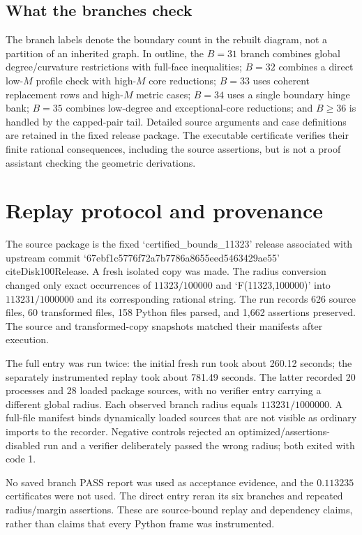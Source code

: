 \documentclass[11pt]{article}
\begin{document}
\subsection{What the branches check}
The branch labels denote the boundary count in the rebuilt diagram, not a partition of an inherited graph. In outline, the $B=31$ branch combines global degree/curvature restrictions with full-face inequalities; $B=32$ combines a direct low-$M$ profile check with high-$M$ core reductions; $B=33$ uses coherent replacement rows and high-$M$ metric cases; $B=34$ uses a single boundary hinge bank; $B=35$ combines low-degree and exceptional-core reductions; and $B\geq36$ is handled by the capped-pair tail. Detailed source arguments and case definitions are retained in the fixed release package. The executable certificate verifies their finite rational consequences, including the source assertions, but is not a proof assistant checking the geometric derivations.

\section{Replay protocol and provenance}
\label{sec:replay}
The source package is the fixed `certified\_bounds\_11323' release associated with upstream commit `67ebf1c5776f72a7b7786a8655eed5463429ae55'~\\cite{Disk100Release}. A fresh isolated copy was made. The radius conversion changed only exact occurrences of $11323/100000$ and `F(11323,100000)' into $113231/1000000$ and its corresponding rational string. The run records 626 source files, 60 transformed files, 158 Python files parsed, and 1,662 assertions preserved. The source and transformed-copy snapshots matched their manifests after execution.

The full entry was run twice: the initial fresh run took about 260.12 seconds; the separately instrumented replay took about 781.49 seconds. The latter recorded 20 processes and 28 loaded package sources, with no verifier entry carrying a different global radius. Each observed branch radius equals $113231/1000000$. A full-file manifest binds dynamically loaded sources that are not visible as ordinary imports to the recorder. Negative controls rejected an optimized/assertions-disabled run and a verifier deliberately passed the wrong radius; both exited with code 1.

No saved branch PASS report was used as acceptance evidence, and the $0.113235$ certificates were not used. The direct entry reran its six branches and repeated radius/margin assertions. These are source-bound replay and dependency claims, rather than claims that every Python frame was instrumented.
\end{document}

